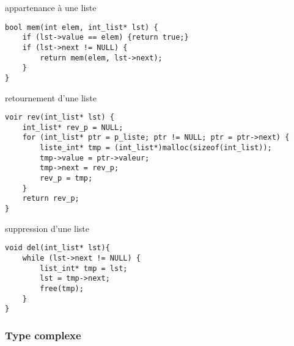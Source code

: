 \begin{fnc*}{appartenance à une liste}
\begin{verbatim}
bool mem(int elem, int_list* lst) {
    if (lst->value == elem) {return true;}
    if (lst->next != NULL) {
        return mem(elem, lst->next);
    }
}
\end{verbatim}
\end{fnc*}
\begin{fnc*}{retournement d'une liste}
\begin{verbatim}
voir rev(int_list* lst) {
    int_list* rev_p = NULL;
    for (int_list* ptr = p_liste; ptr != NULL; ptr = ptr->next) {
        liste_int* tmp = (int_list*)malloc(sizeof(int_list));
        tmp->value = ptr->valeur;
        tmp->next = rev_p;
        rev_p = tmp;
    }
    return rev_p;
}
\end{verbatim}
\end{fnc*}
\begin{fnc*}{suppression d'une liste}
\begin{verbatim}
void del(int_list* lst){
    while (lst->next != NULL) {
        list_int* tmp = lst;
        lst = tmp->next;
        free(tmp);
    }
}
\end{verbatim}
\end{fnc*}
\ocaml
\subsubsection{Type complexe}
